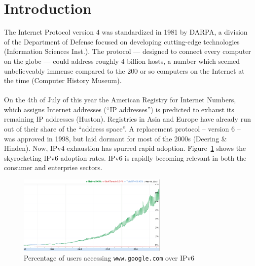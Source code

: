 \documentclass[12pt]{article}
\begin{document}

\section{Introduction}
The Internet Protocol version 4 was standardized in 1981 by DARPA, a division of the Department of Defense focused on developing cutting-edge technologies (Information Sciences Inst.). The protocol --- designed to connect every computer on the globe --- could address roughly 4 billion hosts, a number which seemed unbelieveably immense compared to the 200 or so computers on the Internet at the time (Computer History Museum).\\\\
On the 4th of July of this year the American Registry for Internet Numbers, which assigns Internet addresses (``IP addresses'') is predicted to exhaust its remaining IP addresses (Huston). Registries in Asia and Europe have already run out of their share of the ``address space''.  A replacement protocol -- version 6 -- was approved in 1998, but laid dormant for most of the 2000s (Deering \& Hinden). Now, IPv4 exhaustion has spurred rapid adoption. Figure~\ref{fig:v6_adoption} shows the skyrocketing IPv6 adoption rates. IPv6 is rapidly becoming relevant in both the consumer and enterprise sectors.

\begin{figure}[ht!]
  \centering
  \includegraphics[width=0.65\textwidth]{v6_adoption.png}
  \caption{Percentage of users accessing \texttt{www.google.com} over IPv6}
  \label{fig:v6_adoption}
\end{figure}
\end{document}
